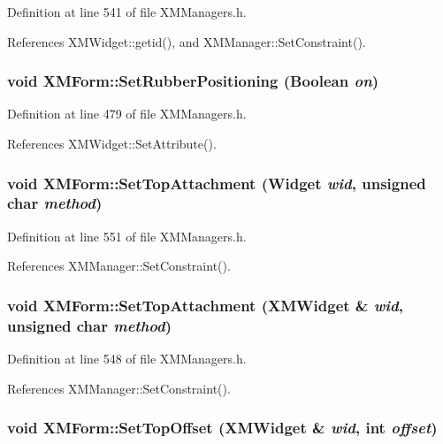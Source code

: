 Definition at line 541 of file XMManagers.h.

References XMWidget::getid(), and XMManager::Set\-Constraint().
\subsubsection{\setlength{\rightskip}{0pt plus 5cm}void XMForm::Set\-Rubber\-Positioning (Boolean {\em on})\hspace{0.3cm}{\tt  [inline]}}\label{classXMForm_a7}




Definition at line 479 of file XMManagers.h.

References XMWidget::Set\-Attribute().
\subsubsection{\setlength{\rightskip}{0pt plus 5cm}void XMForm::Set\-Top\-Attachment (Widget {\em wid}, unsigned char {\em method})\hspace{0.3cm}{\tt  [inline]}}\label{classXMForm_a28}




Definition at line 551 of file XMManagers.h.

References XMManager::Set\-Constraint().
\subsubsection{\setlength{\rightskip}{0pt plus 5cm}void XMForm::Set\-Top\-Attachment ({\bf XMWidget} \& {\em wid}, unsigned char {\em method})\hspace{0.3cm}{\tt  [inline]}}\label{classXMForm_a27}




Definition at line 548 of file XMManagers.h.

References XMManager::Set\-Constraint().
\subsubsection{\setlength{\rightskip}{0pt plus 5cm}void XMForm::Set\-Top\-Offset ({\bf XMWidget} \& {\em wid}, int {\em offset})\hspace{0.3cm}{\tt  [inline]}}\label{classXMForm_a29}




